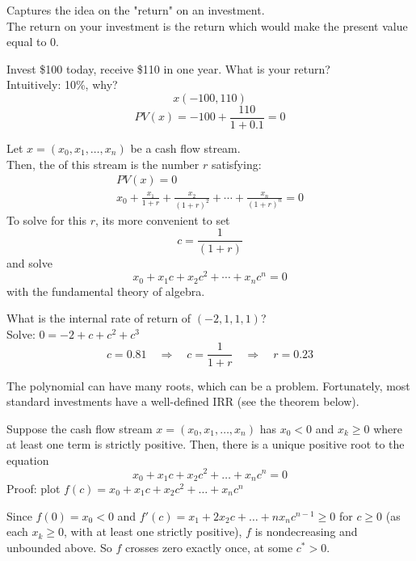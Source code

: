 Captures the idea on the "return" on an investment.
\\The return on your investment is the return which would make the present value equal to 0.
\begin{example}
    Invest \$100 today, receive \$110 in one year. What is your return?
    \\Intuitively: 10\%, why?
    \[x(-100, 110)\]
    \[PV(x) = -100 + \frac{110}{1+0.1} = 0\]
\end{example}

\begin{definition}
    Let $x = (x_0, x_1, \dots, x_n)$ be a cash flow stream. \\Then, the  of this stream is the number $r$ satisfying:
    \[\boxed{\begin{gathered}
        PV(x) = 0 \\
        x_0 + \frac{x_1}{1+r} + \frac{x_2}{(1+r)^2} + \cdots + \frac{x_n}{(1+r)^n} = 0
    \end{gathered}}\]
    To solve for this $r$, its more convenient to set 
    \[c = \frac{1}{(1+r)}\]
    and solve
    \[x_0 + x_1c+ x_2 c^2 + \cdots + x_n c^n = 0\]
    with the fundamental theory of algebra.
\end{definition}

\begin{example}
    What is the internal rate of return of $(-2,1,1,1)$?
    \\Solve: $0 = -2 + c + c^2 + c^3$
    \[c = 0.81 \quad \Rightarrow \quad c = \frac{1}{1+r} \quad \Rightarrow \quad r = 0.23\]
\end{example}
The polynomial can have many roots, which can be a problem. Fortunately, most standard investments have a well-defined IRR (see the theorem below).


Suppose the cash flow stream $x = (x_0, x_1, \dots, x_n)$ has $x_0 < 0$ and $x_k \geq 0$ where at least one term is strictly positive. Then, there is a unique positive root to the equation
\[x_0+x_1c + x_2 c^2 + \dots + x_n c^n = 0\]
Proof: plot $f(c) = x_0 + x_1c + x_2c^2 + \dots + x_n c^n$

\begin{center}
\end{center}
Since $f(0) = x_0 < 0$ and $f'(c) = x_1 + 2x_2c + \dots + nx_nc^{n-1} \geq 0$ for $c \geq 0$ (as each $x_k \geq 0$, with at least one strictly positive), $f$ is nondecreasing and unbounded above. So $f$ crosses zero exactly once, at some $c^* > 0$.

